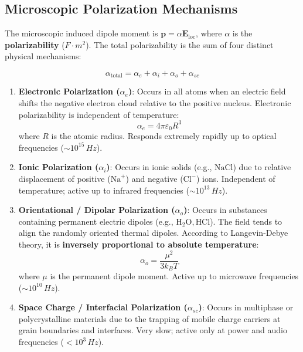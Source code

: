 \subsection{Microscopic Polarization Mechanisms}
The microscopic induced dipole moment is $\mathbf{p} = \alpha \mathbf{E}_{\text{loc}}$, where $\alpha$ is the \textbf{polarizability} ($\si{F\cdot m^2}$). The total polarizability is the sum of four distinct physical mechanisms:

\begin{keyequation}
\begin{equation}
    \alpha_{\text{total}} = \alpha_e + \alpha_i + \alpha_o + \alpha_{sc}
\end{equation}
\end{keyequation}

\begin{enumerate}
    \item \textbf{Electronic Polarization ($\alpha_e$)}: Occurs in all atoms when an electric field shifts the negative electron cloud relative to the positive nucleus. Electronic polarizability is independent of temperature:
    \begin{equation}
        \alpha_e = 4\pi\varepsilon_0 R^3
    \end{equation}
    where $R$ is the atomic radius. Responds extremely rapidly up to optical frequencies ($\sim 10^{15}\,\si{Hz}$).
    \item \textbf{Ionic Polarization ($\alpha_i$)}: Occurs in ionic solids (e.g., $\text{NaCl}$) due to relative displacement of positive ($\text{Na}^+$) and negative ($\text{Cl}^-$) ions. Independent of temperature; active up to infrared frequencies ($\sim 10^{13}\,\si{Hz}$).
    \item \textbf{Orientational / Dipolar Polarization ($\alpha_o$)}: Occurs in substances containing permanent electric dipoles (e.g., $\text{H}_2\text{O}, \text{HCl}$). The field tends to align the randomly oriented thermal dipoles. According to Langevin-Debye theory, it is \textbf{inversely proportional to absolute temperature}:
    \begin{equation}
        \alpha_o = \frac{\mu^2}{3 k_B T}
    \end{equation}
    where $\mu$ is the permanent dipole moment. Active up to microwave frequencies ($\sim 10^{10}\,\si{Hz}$).
    \item \textbf{Space Charge / Interfacial Polarization ($\alpha_{sc}$)}: Occurs in multiphase or polycrystalline materials due to the trapping of mobile charge carriers at grain boundaries and interfaces. Very slow; active only at power and audio frequencies ($<10^3\,\si{Hz}$).
\end{enumerate}

